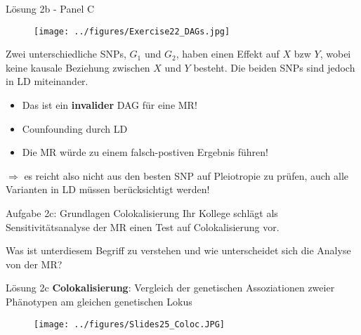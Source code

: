 \documentclass{beamer}
\begin{document}
\begin{frame}{Lösung 2b - Panel C}
\begin{figure}[h]
\begin{center}
\texttt{[image: ../figures/Exercise22\_DAGs.jpg]}
\label{fig:DAGsC}
\end{center}
\end{figure}

Zwei unterschiedliche SNPs, $G_1$ und $G_2$, haben einen Effekt auf $X$ bzw $Y$, wobei keine kausale Beziehung zwischen $X$ und $Y$ besteht. Die beiden SNPs sind jedoch in LD miteinander. 

\begin{itemize}
    \item Das ist ein \textbf{invalider} DAG für eine MR! 
    \item Counfounding durch LD
    \item Die MR würde zu einem falsch-postiven Ergebnis führen!
\end{itemize} 

$\Rightarrow$ es reicht also nicht aus den besten SNP auf Pleiotropie zu prüfen, auch alle Varianten in LD müssen berücksichtigt werden!
\end{frame}

\begin{frame}{Aufgabe 2c: Grundlagen Colokalisierung}
Ihr Kollege schlägt als Sensitivitätsanalyse der MR einen Test auf Colokalisierung vor. 

Was ist unterdiesem Begriff zu verstehen und wie unterscheidet sich die Analyse von der MR?

\end{frame}

\begin{frame}{Lösung 2c}
\textbf{Colokalisierung}: Vergleich der genetischen Assoziationen zweier Phänotypen am gleichen genetischen Lokus

\begin{figure}[h]
\begin{center}
\texttt{[image: ../figures/Slides25\_Coloc.JPG]}
\label{fig:Coloc}
\end{center}
\end{figure}

\end{frame}
\end{document}
